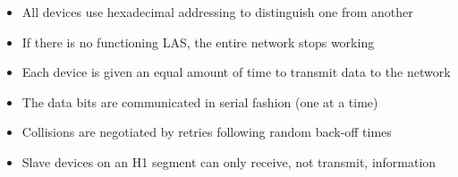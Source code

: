 \begin{itemize}
\item{} All devices use hexadecimal addressing to distinguish one from another
\vskip 5pt 
\item{} If there is no functioning LAS, the entire network stops working
\vskip 5pt 
\item{} Each device is given an equal amount of time to transmit data to the network
\vskip 5pt 
\item{} The data bits are communicated in serial fashion (one at a time)
\vskip 5pt 
\item{} Collisions are negotiated by retries following random back-off times
\vskip 5pt 
\item{} Slave devices on an H1 segment can only receive, not transmit, information
\end{itemize}




